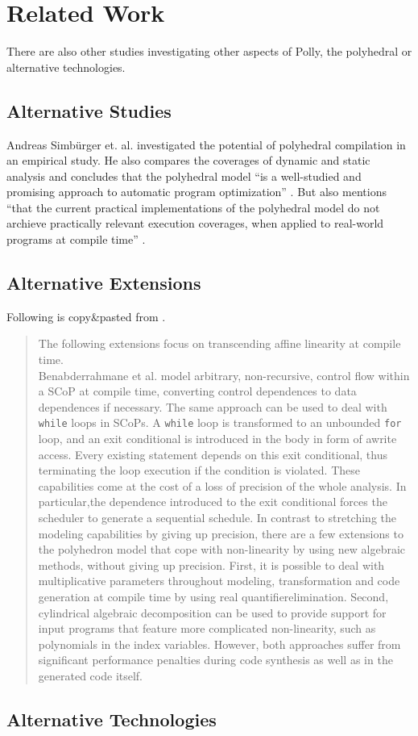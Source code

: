 \chapter{Related Work}
There are also other studies investigating other aspects of Polly, the polyhedral or alternative technologies. 

\section{Alternative Studies}
Andreas Simbürger et. al. \cite{PolyhedralEmpiricalStudy} investigated the potential of polyhedral compilation in an empirical study.
He also compares the coverages of dynamic and static analysis and concludes that the polyhedral model \enquote{is a well-studied and promising approach to automatic program optimization} \cite{PolyhedralEmpiricalStudy}.
But also mentions \enquote{that the current practical implementations of the polyhedral model do not archieve practically relevant execution coverages, when applied to real-world programs at compile time} \cite{PolyhedralEmpiricalStudy}.\\

\section{Alternative Extensions}
Following is copy\&pasted from \cite{PolyhedralEmpiricalStudy}.
\begin{quotation}
The following extensions focus on transcending affine linearity at compile time.\\
Benabderrahmane et al. model arbitrary, non-recursive, control flow within a SCoP at compile time, converting control dependences to data dependences if necessary.
The same approach can be used to deal with \texttt{while} loops in SCoPs.
A \texttt{while} loop is transformed to an unbounded \texttt{for} loop, and an exit conditional is introduced in the body in form of awrite access.
Every existing statement depends on this exit conditional, thus terminating the loop execution if the condition is violated.
These capabilities come at the cost of a loss of precision of the whole analysis.
In particular,the dependence introduced to the exit conditional forces the scheduler to generate a sequential schedule.
In contrast to stretching the modeling capabilities by giving up precision, there are a few extensions to the polyhedron model that cope with non-linearity by using new algebraic methods, without giving up precision.
First, it is possible to deal with multiplicative parameters throughout modeling, transformation and code generation at compile time by using real quantifierelimination.
Second, cylindrical algebraic decomposition can be used to provide support for input programs that feature more complicated non-linearity, such as polynomials in the index variables.
However, both approaches suffer from significant performance penalties during code synthesis as well as in the generated code itself.
\end{quotation}

\section{Alternative Technologies}
